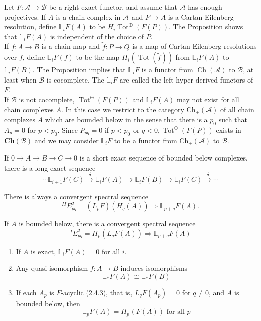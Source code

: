 Let $F: \mathcal{A} \rightarrow \mathcal{B}$ be a right exact functor, and assume that $\mathcal{A}$ has enough projectives. If $A$ is a chain complex in $\mathcal{A}$ and $P \rightarrow A$ is a Cartan-Eilenberg resolution, define $\mathbb{L}_i F(A)$ to be $H_i \operatorname{Tot}^{\oplus}(F(P))$. The Proposition shows that $\mathbb{L}_i F(A)$ is independent of the choice of $P$.\\
If $f: A \rightarrow B$ is a chain map and $\tilde{f}: P \rightarrow Q$ is a map of Cartan-Eilenberg resolutions over $f$, define $\mathbb{L}_i F(f)$ to be the map $H_i(\operatorname{Tot}(\tilde{f}))$ from $\mathbb{L}_i F(A)$ to $\mathbb{L}_i F(B)$. The Proposition implies that $\mathbb{L}_i F$ is a functor from $\operatorname{Ch}(\mathcal{A})$ to $\mathcal{B}$, at least when $\mathcal{B}$ is cocomplete. The $\mathbb{L}_i F$ are called the left hyper-derived functors of $F$.\\
If $\mathcal{B}$ is not cocomplete, $\operatorname{Tot}^{\oplus}(F(P))$ and $\mathbb{L}_i F(A)$ may not exist for all chain complexes $A$. In this case we restrict to the category $\mathrm{Ch}_{+}(\mathcal{A})$ of all chain complexes $A$ which are bounded below in the sense that there is a $p_0$ such that $A_p=0$ for $p<p_0$. Since $P_{p q}=0$ if $p<p_0$ or $q<0, \operatorname{Tot}^{\oplus}(F(P))$ exists in $\mathbf{C h}(\mathcal{B})$ and we may consider $\mathbb{L}_i F$ to be a functor from $\mathrm{Ch}_{+}(\mathcal{A})$ to $\mathcal{B}$.

\begin{lemm}
If $0 \rightarrow A \rightarrow B \rightarrow C \rightarrow 0$ is a short exact sequence of bounded below complexes, there is a long exact sequence
    $$
    \cdots \mathbb{L}_{i+1} F(C) \xrightarrow{\delta} \mathbb{L}_i F(A) \rightarrow \mathbb{L}_i F(B) \rightarrow \mathbb{L}_i F(C) \xrightarrow{\delta} \cdots
    $$    
\end{lemm}


\begin{prop}
There is always a convergent spectral sequence
    $$
    { }^{I I} E_{p q}^2=\left(L_p F\right)\left(H_q(A)\right) \Rightarrow \mathbb{L}_{p+q} F(A) .
    $$
    
    If $A$ is bounded below, there is a convergent spectral sequence
    $$
    { }^I E_{p q}^2=H_p\left(L_q F(A)\right) \Rightarrow \mathbb{L}_{p+q} F(A)
    $$   
\end{prop}

\begin{coro}
\begin{enumerate}
    \item If $A$ is exact, $\mathbb{L}_i F(A)=0$ for all $i$.
    \item Any quasi-isomorphism $f: A \rightarrow B$ induces isomorphisms
    $$
    \mathbb{L}_* F(A) \cong \mathbb{L}_* F(B)
    $$
    \item If each $A_p$ is $F$-acyclic (2.4.3), that is, $L_q F\left(A_p\right)=0$ for $q \neq 0$, and $A$ is bounded below, then
    $$
    \mathbb{L}_p F(A)=H_p(F(A)) \text { for all } p
    $$ 
\end{enumerate}    
\end{coro}

